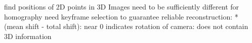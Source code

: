 \documentclass{beamer}
\begin{document}
\begin{frame}[Homography]
	find positions of 2D points in 3D
	Images need to be sufficiently different for homography
	need keyframe selection to guarantee reliable reconstruction:
	* (mean shift - total shift):
	  near 0 indicates rotation of camera: does not contain 3D information
\end{frame}





\end{document}
